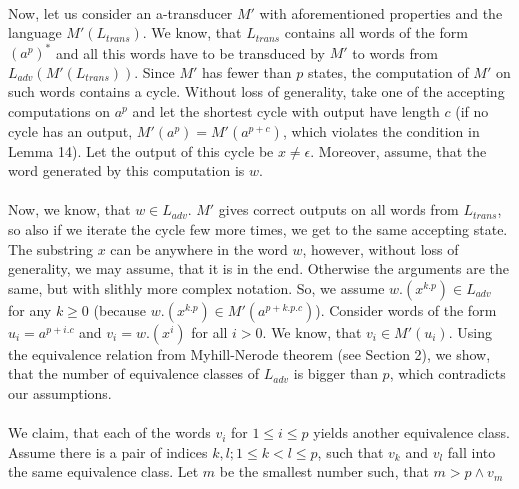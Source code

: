 \paragraph{}
Now, let us consider an a-transducer $M'$ with aforementioned properties and the language $M'(L_{trans})$. We know, that $L_{trans}$ contains all words of the form $(a^p)^*$ and all this words have to be transduced by $M'$ to words from $L_{adv} (M'(L_{trans}))$. Since $M'$ has fewer than $p$ states, the computation of $M'$ on such words contains a cycle. Without loss of generality, take one of the accepting computations on $a^p$ and let the shortest cycle with output have length $c$ (if no cycle has an output, $M'(a^p) = M'(a^{p+c})$, which violates the condition in Lemma 14). Let the output of this cycle be $x \neq \epsilon$. Moreover, assume, that the word generated by this computation is $w$.

\paragraph{}
Now, we know, that $w \in L_{adv}$. $M'$ gives correct outputs on all words from $L_{trans}$, so also if we iterate the cycle few more times, we get to the same accepting state.  The substring $x$ can be anywhere in the word $w$, however, without loss of generality, we may assume, that it is in the end. Otherwise the arguments are the same, but with slithly more complex notation. So, we assume $w.(x^{k.p}) \in L_{adv}$ for any $k \geq 0$ (because $w.(x^{k.p}) \in M'(a^{p+k.p.c})$). Consider words of the form $u_i = a^{p+i.c}$ and $v_i = w.(x^i)$ for all $i > 0$. We know, that $v_i \in M'(u_i)$. Using the equivalence relation from Myhill-Nerode theorem (see Section 2), we show, that the number of equivalence classes of $L_{adv}$ is bigger than $p$, which contradicts our assumptions.

\paragraph{}
We claim, that each of the words $v_i$ for $1 \leq i \leq p$ yields another equivalence class. Assume there is a pair of indices $k,l; 1 \leq k < l \leq p$, such that $v_k$ and $v_l$ fall into the same equivalence class. Let $m$ be the smallest number such, that $m>p \wedge v_m$

